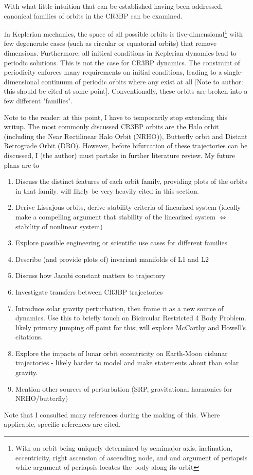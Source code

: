 \documentclass{article}
\begin{document}
With what little intuition that can be established having been addressed, canonical families of orbits in the CR3BP can be examined.

In Keplerian mechanics, the space of all possible orbits is five-dimensional\footnote[1]{With an orbit being uniquely determined by semimajor axis, inclination, eccentricity, right ascension of ascending node, and and argument of periapsis while argument of periapsis locates the body along its orbit} with few degenerate cases (such as circular or equatorial orbits) that remove dimensions. Furthermore, all initical conditions in Keplerian dynamics lead to periodic solutions\cite{BasicOrbitalDynamics}. This is not the case for CR3BP dynamics. The constraint of periodicity enforces many requirements on initial conditions, leading to a single-dimensional continuum of periodic orbits where any exist at all [Note to author: this should be cited at some point]. Conventionally, these orbits are broken into a few different "families".

Note to the reader: at this point, I have to temporarily stop extending this writup. The most commonly discussed CR3BP orbits are the Halo orbit (including the Near Rectilinear Halo Orbit (NRHO)), Butterfly orbit and Distant Retrograde Orbit (DRO). However, before bifurcation of these trajectories can be discussed, I (the author) must partake in further literature review. My future plans are to
\begin{enumerate}
    \item Discuss the distinct features of each orbit family, providing plots of the orbits in that family. \cite{Grebow} will likely be very heavily cited in this section.
    \item Derive Lissajous orbits, derive stability criteria of linearized system (ideally make a compelling argument that stability of the linearized system $\Leftrightarrow$ stability of nonlinear system)
    \item Explore possible engineering or scientific use cases for different families
    \item Describe (and provide plots of) invariant manifolds of L1 and L2
    \item Discuss how Jacobi constant matters to trajectory
    \item Investigate transfers between CR3BP trajectories
    \item Introduce solar gravity perturbation, then frame it as a new source of dynamics. Use this to briefly touch on Bicircular Restricted 4 Body Problem. \cite{mccarthy_quasi-periodic_2022} likely primary jumping off point for this; will explore McCarthy and Howell's citations.
    \item Explore the impacts of lunar orbit eccentricity on Earth-Moon cislunar trajectories - likely harder to model and make statements about than solar gravity.
    \item Mention other sources of perturbation (SRP, gravitational harmonics for NRHO/butterfly)
\end{enumerate}

\newpage
Note that I consulted many references during the making of this. Where applicable, specific references are cited.
\nocite{*}
\end{document}
